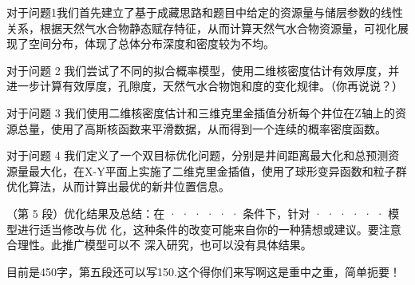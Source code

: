 

{\song\xiaosihao
\setlength{\parindent}{2em}对于问题1我们首先建立了基于成藏思路和题目中给定的资源量与储层参数的线性关系，根据天然气水合物静态赋存特征，从而计算天然气水合物资源量，可视化展现了空间分布，体现了总体分布深度和密度较为不均。


\setlength{\parindent}{2em}
对于问题 2 我们尝试了不同的拟合概率模型，使用二维核密度估计有效厚度，并进一步计算有效厚度，孔隙度，天然气水合物饱和度的变化规律。（你再说说？）

\setlength{\parindent}{2em}对于问题 3 我们使用二维核密度估计和三维克里金插值分析每个井位在Z轴上的资源总量，使用了高斯核函数来平滑数据，从而得到一个连续的概率密度函数。

\setlength{\parindent}{2em}对于问题 4 我们定义了一个双目标优化问题，分别是井间距离最大化和总预测资源量最大化，在X-Y平面上实施了二维克里金插值，使用了球形变异函数和粒子群优化算法，从而计算出最优的新井位置信息。

\setlength{\parindent}{2em}（第 5 段）优化结果及总结：在 · · · · · · 条件下，针对 · · · · · · 模型进行适当修改与优
化，这种条件的改变可能来自你的一种猜想或建议。要注意合理性。此推广模型可以不
深入研究，也可以没有具体结果。}
\begin{rmk}
    目前是450字，第五段还可以写150.这个得你们来写啊这是重中之重，简单扼要！
\end{rmk}






